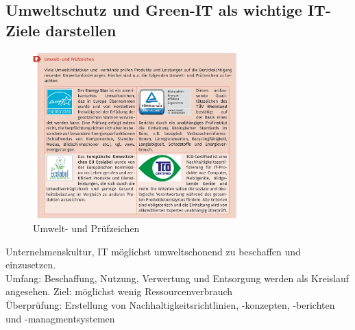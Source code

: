 \subsection{Umweltschutz und Green-IT als wichtige IT-Ziele darstellen}
    \begin{figure}[ht]
        \centering
        \includegraphics[width=0.7\textwidth]{./images/2.3.2_umweltzeichen.png}
        \caption{Umwelt- und Prüfzeichen}\label{fig:Umweltzeichen}
    \end{figure}

    \begin{tcolorbox}[width=11cm, center, title=Green-IT, coltitle=white, colframe=orange, colback=white!60!orange]
        Unternehmenskultur, IT möglichst umweltschonend zu beschaffen und einzusetzen.\\
        Umfang: Beschaffung, Nutzung, Verwertung und Entsorgung werden als Kreislauf angesehen. Ziel: möglichst wenig Ressourcenverbrauch \\
        Überprüfung: Erstellung von Nachhaltigkeitsrichtlinien, -konzepten, -berichten und -managmentsystemen
    \end{tcolorbox}

